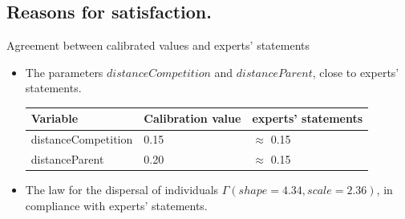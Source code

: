 \documentclass{myBeamer}
\begin{document}
\subsection*{Reasons for satisfaction.}

\begin{frame}{\large{Agreement between calibrated values and experts' statements}}

\begin{itemize}
\item \footnotesize{The parameters $distanceCompetition$ and $distanceParent$, close to experts' statements.}
\smallbreak
\begin{tabular}{lll}
	\hline
     Variable			    &   Calibration value     &   experts' statements \\
   	\hline
		distanceCompetition		&	0.15		&		$\approx$ 0.15	\\
		distanceParent			&	0.20		&		$\approx$ 0.15	\\
     \hline                                   
\end{tabular}

\bigbreak %
\item \footnotesize{The law for the dispersal of individuals $\Gamma(shape=4.34, scale=2.36)$, in compliance with experts' statements.}

\begin{figure}[H] 
\label{loigammaCalibration}
\end{figure}

\end{itemize}

\end{frame}
\end{document}
